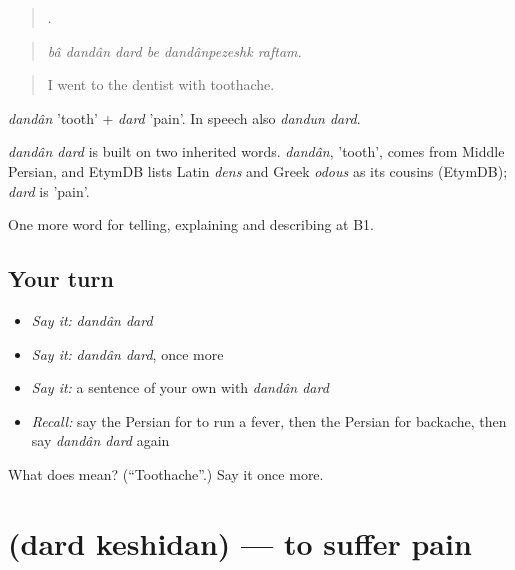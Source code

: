 \begin{quote}
     .
\end{quote}

\begin{quote}
\emph{bâ dandân dard be dandânpezeshk raftam.}
\end{quote}

\begin{quote}
I went to the dentist with toothache.
\end{quote}

\emph{dandân} 'tooth' + \emph{dard} 'pain'. In speech also \emph{dandun dard}.

\begin{cousinweb}
\emph{dandân dard} is built on two inherited words. \emph{dandân}, 'tooth', comes from Middle Persian, and EtymDB lists Latin \emph{dens} and Greek \emph{odous} as its cousins (EtymDB); \emph{dard} is 'pain'.
\end{cousinweb}

\begin{grammarlens}[title={What you've built}]
One more word for telling, explaining and describing at B1.
\end{grammarlens}

\subsection*{Your turn}
\begin{itemize}
\raggedright
  \item \emph{Say it:} \emph{dandân dard}
  \item \emph{Say it:} \emph{dandân dard}, once more
  \item \emph{Say it:} a sentence of your own with \emph{dandân dard}
  \item \emph{Recall:} say the Persian for to run a fever, then the Persian for backache, then say \emph{dandân dard} again
\end{itemize}

\begin{tcolorbox}[breakable,colback=teal!4,colframe=teal!35!black,title={Before you move on}]
What does   mean? (\textquotedblleft{}Toothache\textquotedblright{}.) Say it once more.
\end{tcolorbox}
\section[\texorpdfstring{\fa{درد} \fa{کشیدن} (dard keshidan)}{درد کشیدن (dard keshidan)}]{  (dard keshidan) — to suffer pain}

